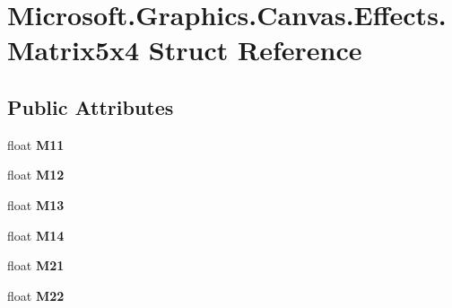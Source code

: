 \hypertarget{struct_microsoft_1_1_graphics_1_1_canvas_1_1_effects_1_1_matrix5x4}{}\section{Microsoft.\+Graphics.\+Canvas.\+Effects.\+Matrix5x4 Struct Reference}
\label{struct_microsoft_1_1_graphics_1_1_canvas_1_1_effects_1_1_matrix5x4}
\subsection*{Public Attributes}
\begin{DoxyCompactItemize}
\item 
\mbox{\label{struct_microsoft_1_1_graphics_1_1_canvas_1_1_effects_1_1_matrix5x4_a3362ecaf3d54af32e74ba1cedbefbe17}} 
float {\bfseries M11}
\item 
\mbox{\label{struct_microsoft_1_1_graphics_1_1_canvas_1_1_effects_1_1_matrix5x4_a9c9aeec622fd59ea5a9ebe781ec72a2d}} 
float {\bfseries M12}
\item 
\mbox{\label{struct_microsoft_1_1_graphics_1_1_canvas_1_1_effects_1_1_matrix5x4_ac7b186b4cd408a0d3a6c12b2e74e2e4b}} 
float {\bfseries M13}
\item 
\mbox{\label{struct_microsoft_1_1_graphics_1_1_canvas_1_1_effects_1_1_matrix5x4_a7be68fd10a8effcbf79d59e92cc5180d}} 
float {\bfseries M14}
\item 
\mbox{\label{struct_microsoft_1_1_graphics_1_1_canvas_1_1_effects_1_1_matrix5x4_a20bbbad9d438eafc051a0b842a8eef05}} 
float {\bfseries M21}
\item 
\mbox{\label{struct_microsoft_1_1_graphics_1_1_canvas_1_1_effects_1_1_matrix5x4_afad68729ba2ebab88f056dbe267df146}} 
float {\bfseries M22}
\item 

\end{DoxyCompactItemize}
